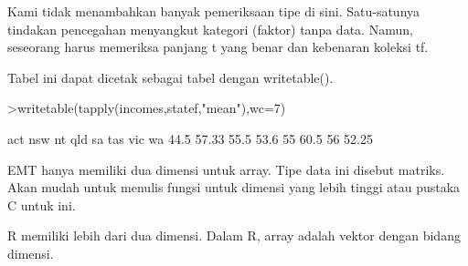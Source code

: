 \documentclass[a4paper,10pt]{article}
\begin{document}
\begin{eulernotebook}
\begin{eulercomment}
\begin{eulercomment}
\begin{eulercomment}
\begin{eulercomment}
\begin{eulercomment}
\begin{eulercomment}
\begin{eulercomment}
\begin{eulercomment}
\begin{eulercomment}
\begin{eulercomment}
\begin{eulercomment}
\begin{eulercomment}
\begin{eulercomment}
\begin{eulercomment}
\begin{eulercomment}
\begin{eulercomment}
\begin{eulercomment}
\begin{eulercomment}
\begin{eulercomment}
\begin{eulercomment}
\begin{eulercomment}
\begin{eulercomment}
\begin{eulercomment}
\begin{eulercomment}
\begin{eulercomment}
\begin{eulercomment}
\begin{eulercomment}
\begin{eulercomment}
\begin{eulercomment}
\begin{eulercomment}
\begin{eulercomment}
\begin{eulercomment}
\begin{eulercomment}
\begin{eulercomment}
\begin{eulercomment}
Kami tidak menambahkan banyak pemeriksaan tipe di sini. Satu-satunya
tindakan pencegahan menyangkut kategori (faktor) tanpa data. Namun,
seseorang harus memeriksa panjang t yang benar dan kebenaran koleksi
tf.

Tabel ini dapat dicetak sebagai tabel dengan writetable().
\end{eulercomment}
\begin{eulerprompt}
>writetable(tapply(incomes,statef,"mean"),wc=7)
\end{eulerprompt}
\begin{euleroutput}
      act    nsw     nt    qld     sa    tas    vic     wa
     44.5  57.33   55.5   53.6     55   60.5     56  52.25
\end{euleroutput}
\begin{eulercomment}
EMT hanya memiliki dua dimensi untuk array. Tipe data ini disebut
matriks. Akan mudah untuk menulis fungsi untuk dimensi yang lebih
tinggi atau pustaka C untuk ini.

R memiliki lebih dari dua dimensi. Dalam R, array adalah vektor dengan
bidang dimensi.


\end{eulercomment}
\end{eulercomment}
\end{eulercomment}
\end{eulercomment}
\end{eulercomment}
\end{eulercomment}
\end{eulercomment}
\end{eulercomment}
\end{eulercomment}
\end{eulercomment}
\end{eulercomment}
\end{eulercomment}
\end{eulercomment}
\end{eulercomment}
\end{eulercomment}
\end{eulercomment}
\end{eulercomment}
\end{eulercomment}
\end{eulercomment}
\end{eulercomment}
\end{eulercomment}
\end{eulercomment}
\end{eulercomment}
\end{eulercomment}
\end{eulercomment}
\end{eulercomment}
\end{eulercomment}
\end{eulercomment}
\end{eulercomment}
\end{eulercomment}
\end{eulercomment}
\end{eulercomment}
\end{eulercomment}
\end{eulercomment}
\end{eulercomment}
\end{eulernotebook}
\end{document}
